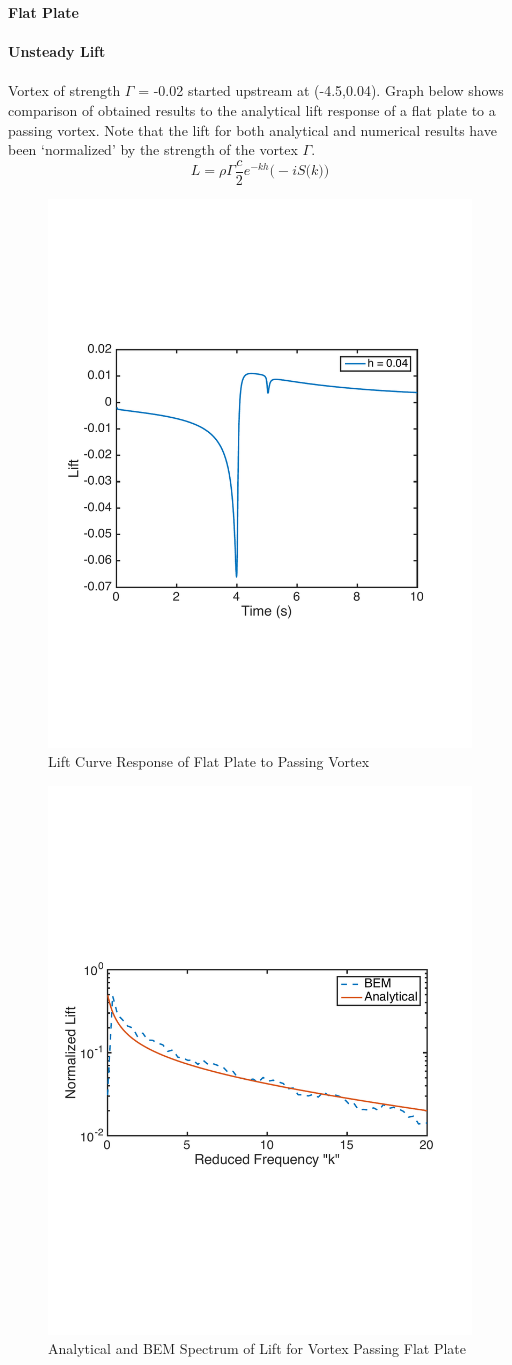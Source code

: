 \documentclass{article}
\begin{document}
\noindent \textbf{Flat Plate} \\ \\
\noindent \textbf{Unsteady Lift}\\ \\
Vortex of strength $\Gamma$ = -0.02 started upstream at (-4.5,0.04). Graph below shows comparison of obtained results to the analytical lift response of a flat plate to a passing vortex. Note that the lift for both analytical and numerical results have been `normalized' by the strength of the vortex $\Gamma$.\\
\begin{equation}
L = \rho \Gamma \frac{c}{2} e^{-kh} \big(-i S\big(k \big) \big)
\end{equation}

\begin{figure}[h]
\includegraphics[width = 4 in, height = 3 in]{Lift_Curve}
\centering
\caption{Lift Curve Response of Flat Plate to Passing Vortex}
\end{figure}

\begin{figure}[h]
\includegraphics[width = 4 in, height = 3 in]{SearsVsBEM}
\centering
\caption{Analytical and BEM Spectrum of Lift for Vortex Passing Flat Plate}
\end{figure}
\newpage
\end{document}
